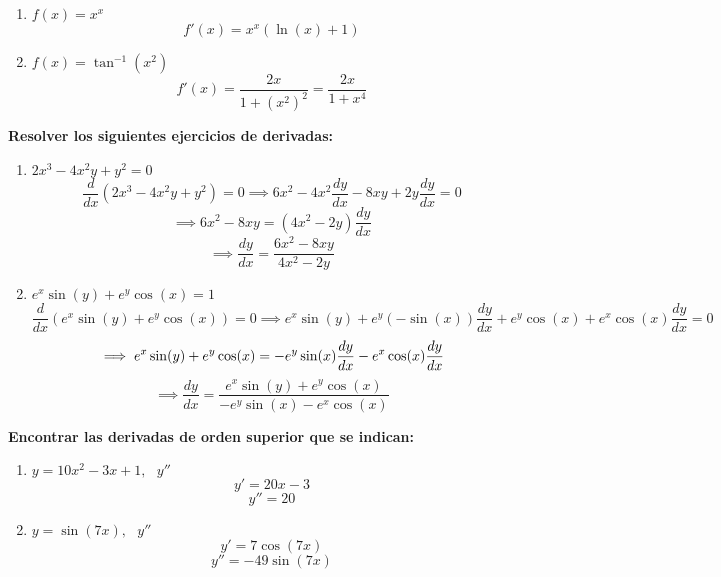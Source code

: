 \documentclass[answers]{exam} %
\begin{document}
\begin{questions}
\begin{enumerate}[label=\alph*.]
        \item $\displaystyle f(x)=x^x$
              \[
                  f'(x) = x^x (\ln(x) + 1)
              \]

        \item $\displaystyle f(x)=\tan^{-1}(x^2)$
              \[
                  f'(x) = \frac{2x}{1+(x^2)^2} = \frac{2x}{1+x^4}
              \]
    \end{enumerate}


    \vspace{0.5cm}

    \question \large\textbf{Resolver los siguientes ejercicios de derivadas: }


    \begin{enumerate}[label=\alph*.]
        \item $\displaystyle 2x^3-4x^2y+y^2=0$
              \[
                  \frac{d}{dx}(2x^3 - 4x^2y + y^2) = 0 \implies 6x^2 - 4x^2 \frac{dy}{dx} - 8xy + 2y \frac{dy}{dx} = 0
              \]
              \[
                  \implies 6x^2 - 8xy = (4x^2 - 2y) \frac{dy}{dx}
              \]
              \[
                  \implies \frac{dy}{dx} = \frac{6x^2 - 8xy}{4x^2 - 2y}
              \]
        \item $\displaystyle e^{x}\sin(y)+e^{y}\cos(x)=1$
              \[
                  \frac{d}{dx}(e^x \sin(y) + e^y \cos(x)) = 0 \implies e^x \sin(y) + e^y (-\sin(x)) \frac{dy}{dx} + e^y \cos(x) + e^x \cos(x) \frac{dy}{dx} = 0
              \]
              \[
                  \implies e^x \sin(y) + e^y \cos(x) = -e^y \sin(x) \frac{dy}{dx} - e^x \cos(x) \frac{dy}{dx} \\[10pt]
              \]
              \[
                  \implies \frac{dy}{dx} = \frac{e^x \sin(y) + e^y \cos(x)}{-e^y \sin(x) - e^x \cos(x)}
              \]
    \end{enumerate}
    \vspace{0.5cm}

    \question \large\textbf{Encontrar las derivadas de orden superior que se indican: }

    \begin{enumerate}[label=\alph*.]
        \item $\displaystyle y=10x^2-3x+1,\text{ } y''$
              \[
                  y' = 20x - 3
              \]
              \[
                  y'' = 20
              \]

        \item $\displaystyle y=\sin(7x),\text{ } y''$
              \[
                  y' = 7\cos(7x)
              \]
              \[
                  y'' = -49\sin(7x)
              \]


\end{enumerate}
\end{questions}
\end{document}
